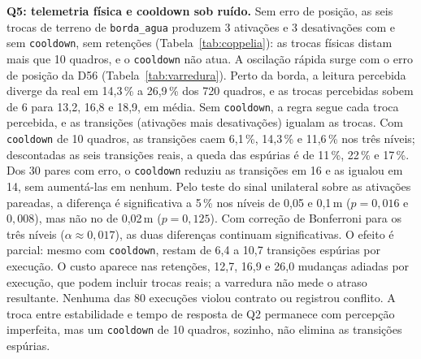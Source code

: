 \documentclass[conference]{IEEEtran}
\makeatletter
\newcommand{\cab}[1]{\begin{tabular}[b]{@{}c@{}}#1\end{tabular}}
\makeatother
\begin{document}
\begin{table}[htbp]
\caption{Varredura do erro de posição (D56) na gravação borda\_agua: médias
de 10 sementes por nível}
\label{tab:varredura}
\centering
\footnotesize
\setlength{\tabcolsep}{3pt}
\end{table}

\textbf{Q5: telemetria física e cooldown sob ruído.} Sem erro de posição, as
seis trocas de terreno de \texttt{borda\_agua} produzem 3 ativações e 3
desativações com e sem \texttt{cooldown}, sem retenções
(Tabela~\ref{tab:coppelia}): as trocas físicas distam mais que 10 quadros, e o
\texttt{cooldown} não atua. A oscilação rápida surge com o erro de posição da
D56 (Tabela~\ref{tab:varredura}). Perto da borda, a leitura percebida diverge
da real em 14,3\,\% a 26,9\,\% dos 720 quadros, e as trocas percebidas sobem
de 6 para 13,2, 16,8 e 18,9, em média. Sem \texttt{cooldown}, a regra segue
cada troca percebida, e as transições (ativações mais desativações) igualam as
trocas. Com \texttt{cooldown} de 10 quadros, as transições caem 6,1\,\%,
14,3\,\% e 11,6\,\% nos três níveis; descontadas as seis transições reais, a
queda das espúrias é de 11\,\%, 22\,\% e 17\,\%. Dos 30 pares com erro, o
\texttt{cooldown} reduziu as transições em 16 e as igualou em 14, sem
aumentá-las em nenhum. Pelo teste do sinal unilateral sobre as ativações pareadas, a diferença é
significativa a 5\,\% nos níveis de 0,05 e 0,1\,m ($p = 0{,}016$ e
$0{,}008$), mas não no de 0,02\,m ($p = 0{,}125$). Com correção de Bonferroni
para os três níveis ($\alpha \approx 0{,}017$), as duas diferenças continuam
significativas. O efeito é parcial: mesmo com \texttt{cooldown}, restam
de 6,4 a 10,7 transições espúrias por execução. O custo aparece nas retenções,
12,7, 16,9 e 26,0 mudanças adiadas por execução, que podem incluir trocas
reais; a varredura não mede o atraso resultante. Nenhuma das 80 execuções
violou contrato ou registrou conflito. A troca entre estabilidade e tempo de
resposta de Q2 permanece com percepção imperfeita, mas um \texttt{cooldown} de
10 quadros, sozinho, não elimina as transições espúrias.
\end{document}
